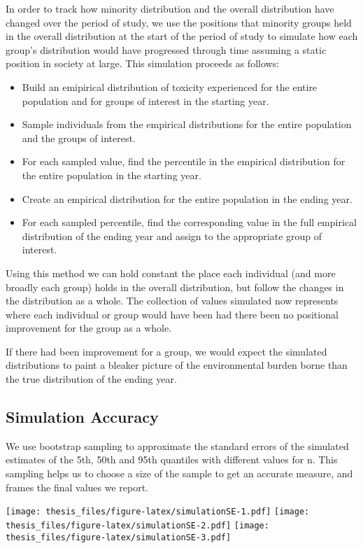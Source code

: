 \documentclass[12pt,twoside]{dukestatscithesis}
\theoremstyle{definition}
\theoremstyle{definition}
\theoremstyle{definition}
\theoremstyle{remark}
\begin{document}
In order to track how minority distribution and the overall distribution
have changed over the period of study, we use the positions that
minority groups held in the overall distribution at the start of the
period of study to simulate how each group's distribution would have
progressed through time assuming a static position in society at large.
This simulation proceeds as follows:
\begin{itemize}
\item
  Build an emipirical distribution of toxicity experienced for the
  entire population and for groups of interest in the starting year.
\item
  Sample individuals from the empirical distributions for the entire
  population and the groups of interest.
\item
  For each sampled value, find the percentile in the empirical
  distribution for the entire population in the starting year.
\item
  Create an empirical distribution for the entire population in the
  ending year.
\item
  For each sampled percentile, find the corresponding value in the full
  empirical distribution of the ending year and assign to the
  appropriate group of interest.
\end{itemize}
Using this method we can hold constant the place each individual (and
more broadly each group) holds in the overall distribution, but follow
the changes in the distribution as a whole. The collection of values
simulated now represents where each individual or group would have been
had there been no positional improvement for the group as a whole.

If there had been improvement for a group, we would expect the simulated
distributions to paint a bleaker picture of the environmental burden
borne than the true distribution of the ending year.

\subsection{Simulation Accuracy}\label{simulation-accuracy}

We use bootstrap sampling to approximate the standard errors of the
simulated estimates of the 5th, 50th and 95th quantiles with different
values for n. This sampling helps us to choose a size of the sample to
get an accurate measure, and frames the final values we report.

\texttt{[image: thesis\_files/figure-latex/simulationSE-1.pdf]}
\texttt{[image: thesis\_files/figure-latex/simulationSE-2.pdf]}
\texttt{[image: thesis\_files/figure-latex/simulationSE-3.pdf]}
\end{document}
